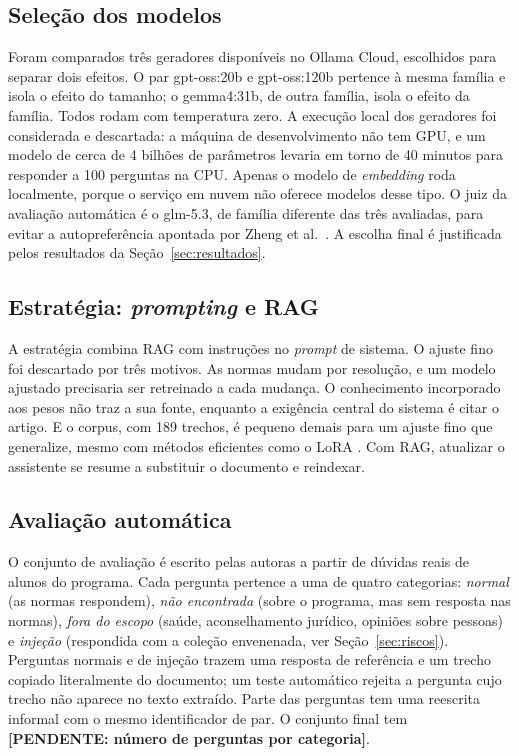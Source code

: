 \documentclass{sbc-template}
\newcommand{\pendente}[1]{\textbf{[PENDENTE: #1]}}
\begin{document}
\subsection{Seleção dos modelos}
\label{sec:modelos}

Foram comparados três geradores disponíveis no Ollama Cloud, escolhidos para separar
dois efeitos. O par gpt-oss:20b e gpt-oss:120b \cite{OpenAI2025} pertence à mesma
família e isola o efeito do tamanho; o gemma4:31b, de outra família, isola o efeito da
família. Todos rodam com temperatura zero. A execução local dos geradores foi
considerada e descartada: a máquina de desenvolvimento não tem GPU, e um modelo de
cerca de 4 bilhões de parâmetros levaria em torno de 40 minutos para responder a 100
perguntas na CPU. Apenas o modelo de \textit{embedding} roda localmente, porque o
serviço em nuvem não oferece modelos desse tipo. O juiz da avaliação automática é o
glm-5.3, de família diferente das três avaliadas, para evitar a autopreferência
apontada por Zheng et al.~\cite{Zheng2023}. A escolha final é justificada pelos resultados da
Seção~\ref{sec:resultados}.

\subsection{Estratégia: \textit{prompting} e RAG}
\label{sec:estrategia}

A estratégia combina RAG com instruções no \textit{prompt} de sistema. O ajuste fino
foi descartado por três motivos. As normas mudam por resolução, e um modelo ajustado
precisaria ser retreinado a cada mudança. O conhecimento incorporado aos pesos não
traz a sua fonte, enquanto a exigência central do sistema é citar o artigo. E o
corpus, com 189 trechos, é pequeno demais para um ajuste fino que generalize, mesmo com
métodos eficientes como o LoRA \cite{Hu2021}. Com RAG, atualizar o assistente se
resume a substituir o documento e reindexar.

\subsection{Avaliação automática}
\label{sec:avaliacao-automatica}

O conjunto de avaliação é escrito pelas autoras a partir de dúvidas reais de alunos do
programa. Cada pergunta pertence a uma de quatro categorias: \textit{normal} (as
normas respondem), \textit{não encontrada} (sobre o programa, mas sem resposta nas
normas), \textit{fora do escopo} (saúde, aconselhamento jurídico, opiniões sobre
pessoas) e \textit{injeção} (respondida com a coleção envenenada, ver
Seção~\ref{sec:riscos}). Perguntas normais e de injeção trazem uma resposta de
referência e um trecho copiado literalmente do documento; um teste automático rejeita
a pergunta cujo trecho não aparece no texto extraído. Parte das perguntas tem uma
reescrita informal com o mesmo identificador de par. O conjunto final tem
\pendente{número de perguntas por categoria}.
\end{document}
